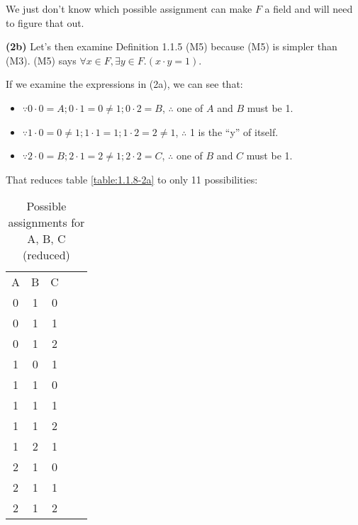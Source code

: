 \documentclass[12pt, letterpaper, oneside]{book}
\begin{document}
We just don't know which possible assignment can make $F$ a field and will need to figure that out.

\textbf{(2b)} Let's then examine Definition 1.1.5 (M5) because (M5) is simpler than (M3). (M5) says $\forall x \in F,
  \exists y \in F. (x \cdot y = 1)$.

If we examine the expressions in (2a), we can see that:
\begin{itemize}
  \item $\because 0 \cdot 0 = A; 0 \cdot 1 = 0 \ne 1; 0 \cdot 2 = B$, $\therefore$ one of $A$ and $B$ must be 1.
  \item $\because 1 \cdot 0 = 0 \ne 1; 1 \cdot 1 = 1; 1 \cdot 2 = 2 \ne 1$, $\therefore$ 1 is the ``y'' of itself.
  \item $\because 2 \cdot 0 = B; 2 \cdot 1 = 2 \ne 1; 2 \cdot 2 = C$, $\therefore$ one of $B$ and $C$ must be 1.
\end{itemize}

That reduces table \ref{table:1.1.8-2a} to only 11 possibilities:

\begin{table}[H]
  \centering
  \begin{tabular}{|c|c|c|ll}
    \cline{1-3}
    A & B & C &  & \\ [1ex] \cline{1-3}
    0 & 1 & 0 &  & \\ [0.5ex] \cline{1-3}
    0 & 1 & 1 &  & \\ [0.5ex] \cline{1-3}
    0 & 1 & 2 &  & \\ [0.5ex] \cline{1-3}
    1 & 0 & 1 &  & \\ [0.5ex] \cline{1-3}
    1 & 1 & 0 &  & \\ [0.5ex] \cline{1-3}
    1 & 1 & 1 &  & \\ [0.5ex] \cline{1-3}
    1 & 1 & 2 &  & \\ [0.5ex] \cline{1-3}
    1 & 2 & 1 &  & \\ [0.5ex] \cline{1-3}
    2 & 1 & 0 &  & \\ [0.5ex] \cline{1-3}
    2 & 1 & 1 &  & \\ [0.5ex] \cline{1-3}
    2 & 1 & 2 &  & \\ [0.5ex] \cline{1-3}
  \end{tabular}
  \caption{Possible assignments for A, B, C (reduced)}
  \label{table:1.1.8-2b}
\end{table}
\end{document}
